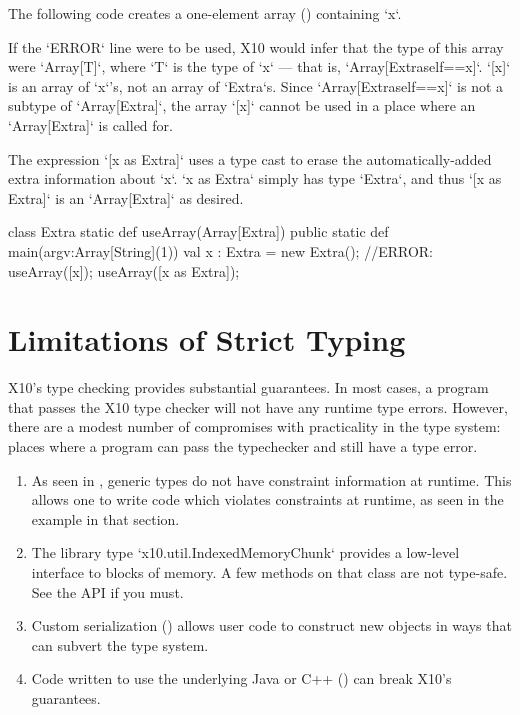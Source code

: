 \begin{ex}
The following code creates a one-element array ()
containing \xcd`x`.  

If  the \xcd`ERROR` line were to be used, 
X10 would infer that the type of this array were \xcd`Array[T]`,
where \xcd`T` is the type of \xcd`x` --- that is, 
\xcd`Array[Extra{self==x}]`.  \xcd`[x]` is an array of \xcd`x`'s, not an array
of \xcd`Extra`s.  Since \xcd`Array[Extra{self==x}]` is not a subtype of 
\xcd`Array[Extra]`, the array \xcd`[x]` cannot be used in a place where an 
\xcd`Array[Extra]` is called for.

The expression \xcd`[x as Extra]` uses a type cast to erase the
automatically-added extra information about \xcd`x`.  \xcd`x as Extra` simply
has type \xcd`Extra`, and thus \xcd`[x as Extra]` is an \xcd`Array[Extra]` as
desired. 


\begin{xten}
class Extra {
  static def useArray(Array[Extra]) {} 
  public static def main(argv:Array[String](1)) {
     val x : Extra = new Extra();
     //ERROR: useArray([x]);
     useArray([x as Extra]);
  }
}
\end{xten}
%


\end{ex}

\section{Limitations of Strict Typing}
\label{sect:LimitationOfStrictTyping}

X10's type checking provides substantial guarantees.  In most cases, a program
that passes the X10 type checker will not have any runtime type errors.
However, there are a modest number of compromises with practicality in the
type system: places where a program can pass the typechecker and still have a
type error.

\begin{enumerate}

\item As seen in , generic types do not have
      constraint information at runtime.  This allows one to write code which
      violates constraints at runtime, as seen in the example in that section. 


\item The library type \xcd`x10.util.IndexedMemoryChunk` provides a low-level interface
      to blocks of memory.  A few methods on that class are not type-safe. See
      the API if you must.

\item Custom serialization () allows user code to
      construct new objects in ways that can subvert the type system.

\item Code written to use the underlying Java or C++ () can
      break X10's guarantees.

\end{enumerate}
